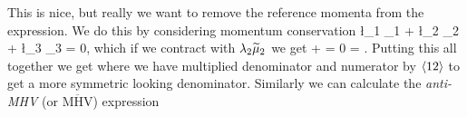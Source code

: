 This is nice, but really we want to remove the reference momenta from the expression. We do this by considering momentum conservation 
\bse 
    \l_1 \widetilde{\l}_1 + \l_2 \widetilde{\l}_2 + \l_3 \widetilde{\l}_3 = 0,
\ese 
which if we contract with $\lambda_2 \widetilde{\mu}_2$ we get 
\be 
\label{eqn:3q21q2}
     \ra [1q_2] +  \ra [3 q_2] = 0 \qquad \implies \qquad \frac{[3q_2]}{[1q_2]} = \frac{\la 12\ra }{\la 23 \ra}. 
\ee 
Putting this all together we get 
\noindent where we have multiplied denominator and numerator by $\langle 12\rangle$ to get a more symmetric looking denominator. Similarly we can calculate the \textit{anti-MHV} (or $\overline{\text{MHV}}$) expression 

